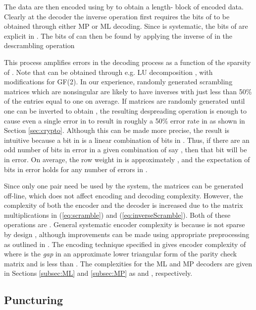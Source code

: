 \documentclass[10pt,twocolumn,twoside]{IEEEtran} \newlength{\pic}
\theoremstyle{definition}
\theoremstyle{remark}
\theoremstyle{plain}
\begin{document}
The data are then encoded using  by  to obtain a length- block of encoded data. Clearly at the decoder the inverse operation first requires the bits of  to be obtained through either MP or ML decoding. Since  is systematic, the bits of  are explicit in . The bits of  can then be found by applying the inverse of  in the descrambling operation

This process amplifies errors in the decoding process as a function of the sparsity of . Note that  can be obtained through e.g. LU decomposition \cite{MoonBlack}, with modifications for GF(2). In our experience, randomly generated scrambling matrices which are nonsingular are likely to have inverses with just less than 50\% of the entries equal to one on average. If  matrices are randomly generated until one can be inverted to obtain , the resulting despreading operation is enough to cause even a single error in  to result in roughly a 50\% error rate in  as shown in Section \ref{sec:crypto}. Although this can be made more precise, the result is intuitive because a bit in  is a linear combination of bits in . Thus, if there are an odd number of bits in error in a given combination of say , then that bit will be in error. On average, the row weight in  is approximately , and the expectation of  bits in error holds for any number of errors in .

Since only one  pair need be used by the system, the matrices can be generated off-line, which does not affect encoding and decoding complexity. However, the complexity of both the encoder and the decoder is increased due to the matrix multiplications in (\ref{eq:scramble}) and (\ref{eq:inverseScramble}). Both of these operations are . General systematic encoder complexity is  because  is not sparse by design \cite{MoonArches}, although improvements can be made using appropriate preprocessing as outlined in \cite{Urbanke01}. The encoding technique specified in \cite{Urbanke01} gives encoder complexity of  where  is the \emph{gap} in an approximate lower triangular form of the parity check matrix and is less than . The complexities for the ML and MP decoders are given in Sections \ref{subsec:ML} and \ref{subsec:MP} as  and , respectively.

\subsection{Puncturing}\label{subsec:puncturing}
\end{document}
